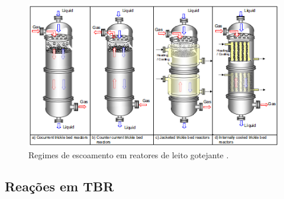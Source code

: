 \begin{figure}[htb]
 \centering \includegraphics[scale=0.75]{images/Chap2/configuracoestbr.png}
 \caption{Regimes de escoamento em reatores de leito gotejante \cite{Gunjal2005}.}
 \label{fig:configuracoestbr}
 \end{figure}
 
 \subsection{Reações em TBR} \label{sec:reacoes}
 
